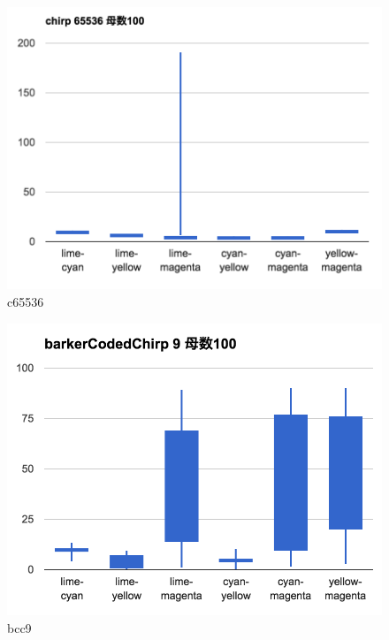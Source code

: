 \begin{figure}[p]
  \centering
  \includegraphics[clip,width=1.05\hsize]{img/c65536.png}
  \caption{c65536}\label{fig:c65536}
\end{figure}



\clearpage



\begin{figure}[p]
  \centering
  \includegraphics[clip,width=1.05\hsize]{img/bcc9.png}
  \caption{bcc9}\label{fig:bcc9}
\end{figure}


